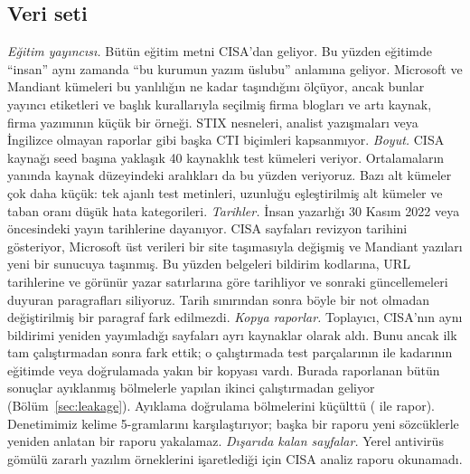 \documentclass[journal]{IEEEtran}
\begin{document}
\subsection{Veri seti}
\emph{Eğitim yayıncısı.} Bütün eğitim metni CISA'dan geliyor. Bu yüzden eğitimde ``insan'' aynı zamanda ``bu
kurumun yazım üslubu'' anlamına geliyor. Microsoft ve Mandiant kümeleri bu yanlılığın ne kadar taşındığını ölçüyor,
ancak bunlar yayıncı etiketleri ve başlık kurallarıyla seçilmiş firma blogları ve \NExtSourcesMicrosoft{} artı
\NExtSourcesMandiant{} kaynak, firma yazımının küçük bir örneği. STIX nesneleri, analist yazışmaları veya İngilizce
olmayan raporlar gibi başka CTI biçimleri kapsanmıyor. \emph{Boyut.} \NSources{} CISA kaynağı seed başına yaklaşık
40 kaynaklık test kümeleri veriyor. Ortalamaların yanında kaynak düzeyindeki aralıkları da bu yüzden veriyoruz.
Bazı alt kümeler çok daha küçük: tek ajanlı test metinleri, uzunluğu eşleştirilmiş alt kümeler ve taban oranı düşük
hata kategorileri. \emph{Tarihler.} İnsan yazarlığı 30 Kasım 2022 veya öncesindeki yayın tarihlerine dayanıyor.
CISA sayfaları revizyon tarihini gösteriyor, Microsoft üst verileri bir site taşımasıyla değişmiş ve Mandiant
yazıları yeni bir sunucuya taşınmış. Bu yüzden belgeleri bildirim kodlarına, URL tarihlerine ve görünür yazar
satırlarına göre tarihliyor ve sonraki güncellemeleri duyuran paragrafları siliyoruz. Tarih sınırından sonra böyle
bir not olmadan değiştirilmiş bir paragraf fark edilmezdi. \emph{Kopya raporlar.} Toplayıcı, CISA'nın aynı
bildirimi yeniden yayımladığı sayfaları ayrı kaynaklar olarak aldı. Bunu ancak ilk tam çalıştırmadan sonra fark
ettik; o çalıştırmada test parçalarının \LeakPlainDupShareMin{} ile \LeakPlainDupShareMax{} kadarının eğitimde veya
doğrulamada yakın bir kopyası vardı. Burada raporlanan bütün sonuçlar ayıklanmış bölmelerle yapılan ikinci
çalıştırmadan geliyor (Bölüm~\ref{sec:leakage}). Ayıklama doğrulama bölmelerini küçülttü (\LeakValMin{} ile
\LeakValMax{} rapor). Denetimimiz kelime 5-gramlarını karşılaştırıyor; başka bir raporu yeni sözcüklerle
yeniden anlatan bir raporu yakalamaz. \emph{Dışarıda kalan sayfalar.} Yerel antivirüs gömülü
zararlı yazılım örneklerini işaretlediği için \NBlocked{} CISA analiz raporu okunamadı.
\end{document}
